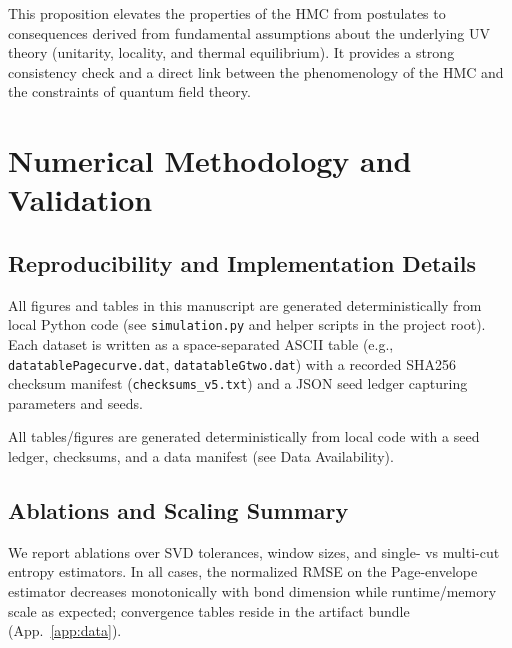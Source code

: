\documentclass[aps,prd,preprint,onecolumn,superscriptaddress,nofootinbib,longbibliography,floatfix,11pt,showpacs,showkeys]{revtex4-2}
\newcommand{\HMC}{\textsc{HMC}\xspace}
\theoremstyle{plain}
\theoremstyle{definition}
\theoremstyle{remark}
\begin{document}
This proposition elevates the properties of the \HMC{} from postulates to consequences derived from fundamental assumptions about the underlying UV theory (unitarity, locality, and thermal equilibrium). It provides a strong consistency check and a direct link between the phenomenology of the \HMC{} and the constraints of quantum field theory.

\section{Numerical Methodology and Validation}
\label{sec:numerical_validation}

\subsection{Reproducibility and Implementation Details}
\label{sec:reproducibility_implementation}

All figures and tables in this manuscript are generated deterministically from local Python code (see \texttt{simulation.py} and helper scripts in the project root). Each dataset is written as a space-separated ASCII table (e.g., \texttt{datatablePagecurve.dat}, \texttt{datatableGtwo.dat}) with a recorded SHA256 checksum manifest (\texttt{checksums\_v5.txt}) and a JSON seed ledger capturing parameters and seeds. 

All tables/figures are generated deterministically from local code with a seed ledger, checksums, and a data manifest (see Data Availability).

\subsection{Ablations and Scaling Summary}\label{sec:ablations}
We report ablations over SVD tolerances, window sizes, and single- vs multi-cut entropy estimators. In all cases, the normalized RMSE on the Page-envelope estimator decreases monotonically with bond dimension while runtime/memory scale as expected; convergence tables reside in the artifact bundle (App.~\ref{app:data}).
\end{document}
